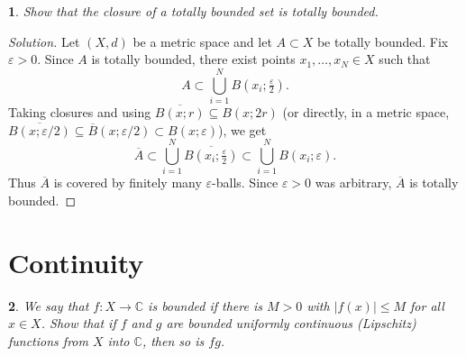 \documentclass[12pt, a4paper]{report}
\theoremstyle{spaced}
\newtheorem{exercise}{}
\newcommand{\setexercise}[1]{\setcounter{exercise}{#1-1}}
\begin{document}
\setexercise{6}
\begin{exercise}
	Show that the closure of a totally bounded set is totally bounded.
\end{exercise}

\begin{proof}[Solution]
	Let $(X,d)$ be a metric space and let $A\subset X$ be totally bounded.
	Fix $\varepsilon>0$. Since $A$ is totally bounded, there exist points
	$x_1,\dots,x_N\in X$ such that
	\[
		A \subset \bigcup_{i=1}^N B\!\left(x_i;\tfrac{\varepsilon}{2}\right).
	\]
	Taking closures and using $\overline{B(x;r)}\subseteq B(x;2r)$ (or directly,
	in a metric space, $\overline{B(x;\varepsilon/2)}\subseteq \overline{B}(x;\varepsilon/2)
		\subset B(x;\varepsilon)$), we get
	\[
		\overline{A}\subset \bigcup_{i=1}^N
		\overline{B\!\left(x_i;\tfrac{\varepsilon}{2}\right)}
		\subset \bigcup_{i=1}^N B(x_i;\varepsilon).
	\]
	Thus $\overline{A}$ is covered by finitely many $\varepsilon$-balls. Since
	$\varepsilon>0$ was arbitrary, $\overline{A}$ is totally bounded.
\end{proof}

\section{Continuity}

\setexercise{3}
\begin{exercise}
	We say that $f : X \to \mathbb{C}$ is bounded if there is $M>0$ with
	$|f(x)|\le M$ for all $x\in X$. Show that if $f$ and $g$ are bounded uniformly
	continuous (Lipschitz) functions from $X$ into $\mathbb{C}$, then so is $fg$.
\end{exercise}
\end{document}
